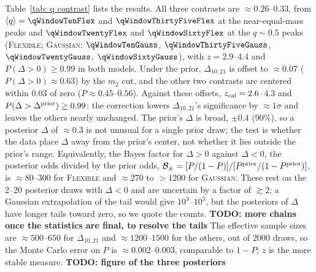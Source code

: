 \documentclass[%
 onecolumn,
 amsmath,amssymb,
 aps,
 prl,
 nofootinbib,nobibnotes,
]{revtex4-2}
\newcommand{\todo}[1]{{\color{Blue}\bf TODO: #1}}
\newcommand{\flexiblespins}{\textsc{Flexible}\xspace}
\newcommand{\gaussianspins}{\textsc{Gaussian}\xspace}
\newcommand{\featTen}{10\xspace}
\newcommand{\featTwenty}{21\xspace}
\begin{document}
Table~\ref{tab: q contrast} lists the results. All three contrasts are $\approx 0.26$--$0.33$, from $\langle q \rangle = \qWindowTenFlex$ and $\qWindowThirtyFiveFlex$ at the near-equal-mass peaks and $\qWindowTwentyFlex$ and $\qWindowSixtyFlex$ at the $q \sim 0.5$ peaks (\flexiblespins; \gaussianspins: $\qWindowTenGauss$, $\qWindowThirtyFiveGauss$, $\qWindowTwentyGauss$, $\qWindowSixtyGauss$), with $z = 2.9$--$4.4$ and $P(\Delta > 0) \geq 0.99$ in both models. Under the prior, $\Delta_{\featTen,\featTwenty}$ is offset to $\approx 0.07$ ($P(\Delta > 0) \approx 0.63$) by the $m_2$ cut, and the other two contrasts are centered within $0.03$ of zero ($P \approx 0.45$--$0.56$). Against these offsets, $z_{\rm cal} = 2.6$--$4.3$ and $P(\Delta > \Delta^{\rm prior}) \geq 0.99$: the correction lowers $\Delta_{\featTen,\featTwenty}$'s significance by $\approx 1\sigma$ and leaves the others nearly unchanged. The prior's $\Delta$ is broad, $\pm 0.4$ (90\%), so a posterior $\Delta$ of $\approx 0.3$ is not unusual for a single prior draw; the test is whether the data place $\Delta$ away from the prior's center, not whether it lies outside the prior's range. Equivalently, the Bayes factor for $\Delta > 0$ against $\Delta < 0$, the posterior odds divided by the prior odds, $\mathcal{B}_{\pm} = [P/(1-P)]/[P^{\rm prior}/(1-P^{\rm prior})]$, is $\approx 80$--$300$ for \flexiblespins and $\approx 270$ to $> 1200$ for \gaussianspins. These rest on the 2--20 posterior draws with $\Delta < 0$ and are uncertain by a factor of $\gtrsim 2$; a Gaussian extrapolation of the tail would give $10^3$--$10^5$, but the posteriors of $\Delta$ have longer tails toward zero, so we quote the counts. \todo{more chains once the statistics are final, to resolve the tails} The effective sample sizes are $\approx 500$--$650$ for $\Delta_{\featTen,\featTwenty}$ and $\approx 1200$--$1500$ for the others, out of 2000 draws, so the Monte Carlo error on $P$ is $\approx 0.002$--$0.003$, comparable to $1 - P$; $z$ is the more stable measure. \todo{figure of the three posteriors}
\end{document}
